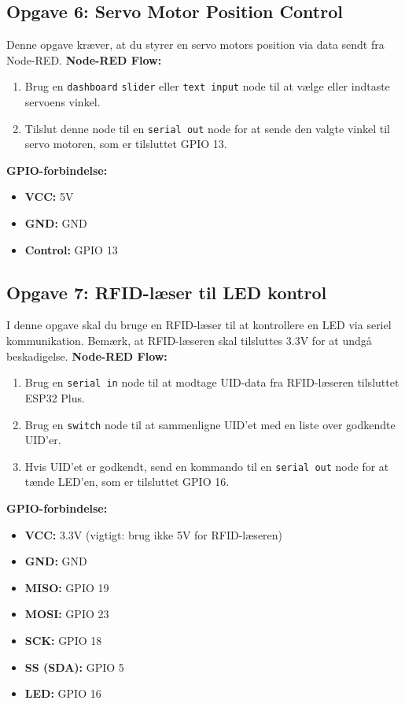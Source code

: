 \subsection{Opgave 6: Servo Motor Position Control}
Denne opgave kræver, at du styrer en servo motors position via data sendt fra Node-RED.
\newline\newline\noindent
\textbf{Node-RED Flow:}
\begin{enumerate}
	\item Brug en \texttt{dashboard} \texttt{slider} eller \texttt{text input} node til at vælge eller indtaste servoens vinkel.
	\item Tilslut denne node til en \texttt{serial out} node for at sende den valgte vinkel til servo motoren, som er tilsluttet GPIO 13.
\end{enumerate}
\noindent
\textbf{GPIO-forbindelse:}
\begin{itemize}
	\item \textbf{VCC:} 5V
	\item \textbf{GND:} GND
	\item \textbf{Control:} GPIO 13
\end{itemize}

\subsection{Opgave 7: RFID-læser til LED kontrol}
I denne opgave skal du bruge en RFID-læser til at kontrollere en LED via seriel kommunikation. Bemærk, at RFID-læseren skal tilsluttes 3.3V for at undgå beskadigelse.
\newline\newline\noindent
\textbf{Node-RED Flow:}
\begin{enumerate}
	\item Brug en \texttt{serial in} node til at modtage UID-data fra RFID-læseren tilsluttet ESP32 Plus.
	\item Brug en \texttt{switch} node til at sammenligne UID'et med en liste over godkendte UID'er.
	\item Hvis UID'et er godkendt, send en kommando til en \texttt{serial out} node for at tænde LED'en, som er tilsluttet GPIO 16.
\end{enumerate}
\noindent
\textbf{GPIO-forbindelse:}
\begin{itemize}
	\item \textbf{VCC:} 3.3V (vigtigt: brug ikke 5V for RFID-læseren)
	\item \textbf{GND:} GND
	\item \textbf{MISO:} GPIO 19
	\item \textbf{MOSI:} GPIO 23
	\item \textbf{SCK:} GPIO 18
	\item \textbf{SS (SDA):} GPIO 5
	\item \textbf{LED:} GPIO 16
\end{itemize}

